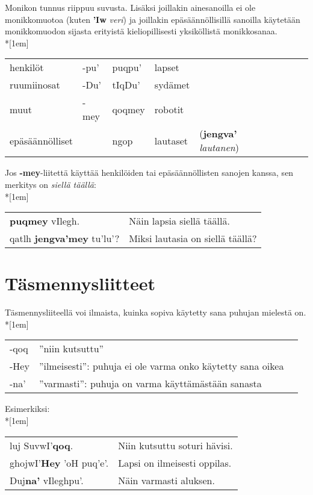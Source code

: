 \documentclass{book}
\begin{document}
Monikon tunnus riippuu suvusta.
Lisäksi joillakin ainesanoilla ei ole monikkomuotoa (kuten \textbf{'Iw} \textit{veri})
ja joillakin epäsäännöllisillä sanoilla käytetään monikkomuodon sijasta erityistä kieliopillisesti yksiköllistä monikkosanaa.\\*[1em]
\begin{tabular}{l Bl | Bl Il l}
henkilöt & -pu' & puqpu' & lapset & \\
ruumiinosat & -Du' & tIqDu' & sydämet & \\
muut & -mey & qoqmey & robotit & \\
epäsäännölliset & & ngop & lautaset & (\textbf{jengva'} \textit{lautanen}) \\
\end{tabular}

Jos \textbf{-mey}-liitettä käyttää henkilöiden tai epäsäännöllisten sanojen kanssa, sen merkitys on \textit{siellä täällä}:\\*[1em]
\begin{tabular}{l l}
    \textbf{puqmey} vIlegh. & Näin lapsia siellä täällä. \\
    qatlh \textbf{jengva'mey} tu'lu'? & Miksi lautasia on siellä täällä? \\
\end{tabular}

\section{Täsmennysliitteet}

Täsmennysliiteellä voi ilmaista, kuinka sopiva käytetty sana puhujan mielestä on.\\*[1em]
\begin{tabular}{Bl l}
    -qoq & ''niin kutsuttu'' \\
    -Hey & ''ilmeisesti'': puhuja ei ole varma onko käytetty sana oikea \\
    -na' & ''varmasti'': puhuja on varma käyttämästään sanasta \\
\end{tabular}

Esimerkiksi:\\*[1em]
\begin{tabular}{l l}
    luj SuvwI'\textbf{qoq}. & Niin kutsuttu soturi hävisi. \\
    ghojwI'\textbf{Hey} 'oH puq'e'. & Lapsi on ilmeisesti oppilas. \\
    Duj\textbf{na'} vIleghpu'. & Näin varmasti aluksen. \\
\end{tabular}
\end{document}
